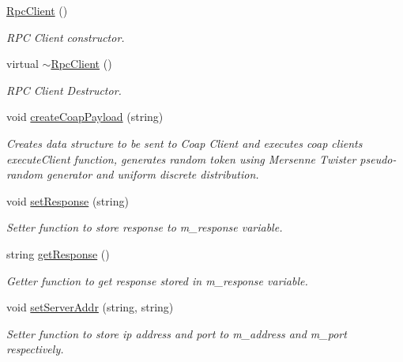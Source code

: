 \begin{DoxyCompactItemize}
\item 
\mbox{\label{classcoappbrpc_1_1RpcClient_a7b8bc754005e340d675684edae545084}} 
\hyperlink{classcoappbrpc_1_1RpcClient_a7b8bc754005e340d675684edae545084}{Rpc\+Client} ()
\begin{DoxyCompactList}\small\item\em R\+PC Client constructor. \end{DoxyCompactList}\item 
\mbox{\label{classcoappbrpc_1_1RpcClient_a9b90b3ba0fef5ebd90748e454c1c7fd9}} 
virtual \hyperlink{classcoappbrpc_1_1RpcClient_a9b90b3ba0fef5ebd90748e454c1c7fd9}{$\sim$\+Rpc\+Client} ()
\begin{DoxyCompactList}\small\item\em R\+PC Client Destructor. \end{DoxyCompactList}\item 
\mbox{\label{classcoappbrpc_1_1RpcClient_a17515cafc3ef2d46517ff18b165fb452}} 
void \hyperlink{classcoappbrpc_1_1RpcClient_a17515cafc3ef2d46517ff18b165fb452}{create\+Coap\+Payload} (string)
\begin{DoxyCompactList}\small\item\em Creates data structure to be sent to Coap Client and executes coap client\textquotesingle{}s execute\+Client function, generates random token using Mersenne Twister pseudo-\/random generator and uniform discrete distribution. \end{DoxyCompactList}\item 
void \hyperlink{classcoappbrpc_1_1RpcClient_a0f08b63838a62377d4470eb2a0259178}{set\+Response} (string)
\begin{DoxyCompactList}\small\item\em Setter function to store response to m\+\_\+response variable. \end{DoxyCompactList}\item 
\mbox{\label{classcoappbrpc_1_1RpcClient_ac79e3b2a76335a214cbe1c6f169d46c2}} 
string \hyperlink{classcoappbrpc_1_1RpcClient_ac79e3b2a76335a214cbe1c6f169d46c2}{get\+Response} ()
\begin{DoxyCompactList}\small\item\em Getter function to get response stored in m\+\_\+response variable. \end{DoxyCompactList}\item 
void \hyperlink{classcoappbrpc_1_1RpcClient_a69755d690a7f2d6373e191d359e48986}{set\+Server\+Addr} (string, string)
\begin{DoxyCompactList}\small\item\em Setter function to store ip address and port to m\+\_\+address and m\+\_\+port respectively. \end{DoxyCompactList}\end{DoxyCompactItemize}
